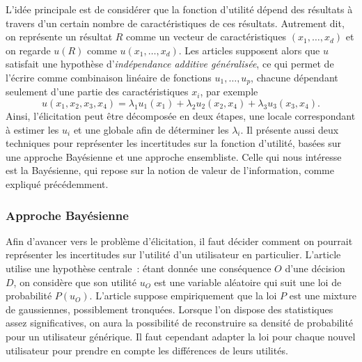 \documentclass[a4paper,11pt]{article}
\theoremstyle{plain}
\theoremstyle{definition}
\begin{document}
L'idée principale est de considérer que la fonction d'utilité dépend des résultats à travers d'un certain nombre de caractéristiques de ces résultats. Autrement dit, on représente un résultat $R$ comme un vecteur de caractéristiques $(x_1, \dotsc, x_d)$ et on regarde $u(R)$ comme $u(x_1, \dotsc, x_d)$. Les articles \cite{Braziunas_2008, braziunas_local_2005} supposent alors que $u$ satisfait une hypothèse d'\emph{indépendance additive généralisée}, ce qui permet de l'écrire comme combinaison linéaire de fonctions $u_1, \dotsc, u_p$, chacune dépendant seulement d'une partie des caractéristiques $x_i$, par exemple
\begin{equation}
\label{IndependanceAdditiveGeneralisee}
u(x_1, x_2, x_3, x_4) = \lambda_1 u_1(x_1) + \lambda_2 u_2(x_2, x_4) + \lambda_3 u_3(x_3, x_4).
\end{equation}
Ainsi, l'élicitation peut être décomposée en deux étapes, une locale correspondant à estimer les $u_i$ et une globale afin de déterminer les $\lambda_i$. Il présente aussi deux techniques pour représenter les incertitudes sur la fonction d'utilité, basées sur une approche Bayésienne et une approche ensembliste. Celle qui nous intéresse est la Bayésienne, qui repose sur la notion de valeur de l'information, comme expliqué précédemment.

\subsubsection{Approche Bayésienne}

Afin d'avancer vers le problème d'élicitation, il faut décider comment on pourrait représenter les incertitudes sur l'utilité d'un utilisateur en particulier. L'article \cite{chajewska_making_2000} utilise une hypothèse centrale~: étant donnée une conséquence $O$ d'une décision $D$, on considère que son utilité $u_O$ est une variable aléatoire qui suit une loi de probabilité $P(u_O)$. L'article suppose empiriquement que la loi $P$ %
est une mixture de gaussiennes, possiblement tronquées. Lorsque l'on dispose des statistiques assez significatives, on aura la possibilité de reconstruire sa densité de probabilité pour un utilisateur générique. Il faut cependant adapter la loi pour chaque nouvel utilisateur pour prendre en compte les différences de leurs utilités.
\end{document}
